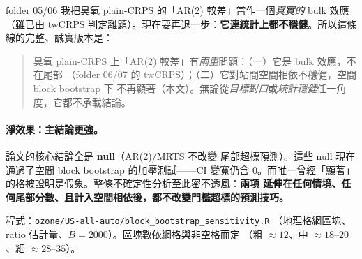 \documentclass[12pt]{article}
\begin{document}
folder 05/06 我把臭氧 plain-CRPS 的「AR(2) 較差」當作一個\emph{真實的} bulk 效應
（雖已由 twCRPS 判定離題）。現在要再退一步：\textbf{它連統計上都不穩健}。所以這條
線的完整、誠實版本是：

\begin{quote}
臭氧 plain-CRPS 上「AR(2) 較差」有\emph{兩重}問題：（一）它是 bulk 效應，不在尾部
（folder 06/07 的 twCRPS）；（二）它對站間空間相依不穩健，空間 block bootstrap 下
不再顯著（本文）。無論從\emph{目標對口}或\emph{統計穩健}任一角度，它都不承載結論。
\end{quote}

\paragraph{淨效果：主結論更強。}論文的核心結論全是 \textbf{null}（AR(2)/MRTS 不改變
尾部超標預測）。這些 null 現在通過了空間 block bootstrap 的加壓測試——CI 變寬仍含
$0$。而唯一曾經「顯著」的格被證明是假象。整條不確定性分析至此密不透風：\textbf{兩項
延伸在任何情境、任何尾部分數、且計入空間相依後，都不改變門檻超標的預測技巧。}

\medskip
\noindent\footnotesize 程式：\verb|ozone/US-all-auto/block_bootstrap_sensitivity.R|
（地理格網區塊、ratio 估計量、$B{=}2000$）。區塊數依網格與非空格而定
（粗 $\approx12$、中 $\approx18$--$20$、細 $\approx28$--$35$）。
\end{document}

